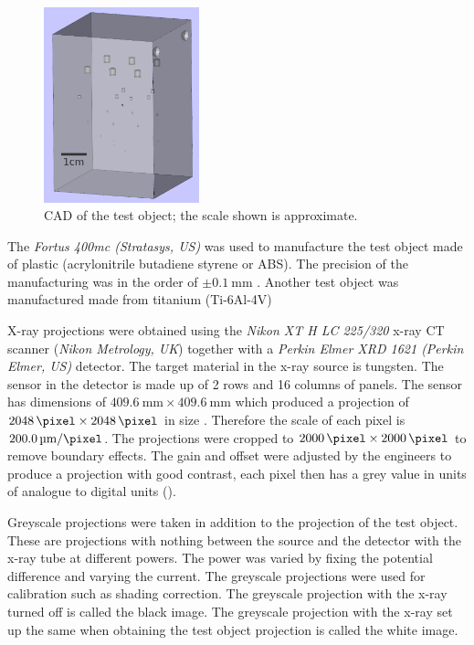 \begin{figure}
  \centering
  \includegraphics[width=0.4\textwidth]{../figures/inference/TestObject.png}
  \caption{CAD of the test object; the scale shown is approximate.}
  \label{fig:inference_testObject}
\end{figure}

The \emph{Fortus 400mc (Stratasys, US)} was used to manufacture the test object made of plastic (acrylonitrile butadiene styrene or ABS). The precision of the manufacturing was in the order of $\pm\SI{0.1}{\milli\metre}$ \citep{hanseen2013fortus}. Another test object was manufactured made from titanium (Ti-6Al-4V)

X-ray projections were obtained using the \emph{Nikon XT H LC 225/320} x-ray CT scanner (\emph{Nikon Metrology, UK}) together with a \emph{Perkin Elmer XRD 1621 (Perkin Elmer, US)} detector. The target material in the x-ray source is tungsten. The sensor in the detector is made up of 2 rows and 16 columns of panels. The sensor has dimensions of $\SI{409.6}{\milli\metre}\times\SI{409.6}{\milli\metre}$ which produced a projection of $\SI{2048}{\pixel}\times\SI{2048}{\pixel}$ in size \citep{perkinelmer2006xrd}. Therefore the scale of each pixel is $\SI{200.0}{\micro\metre\per\pixel}$. The projections were cropped to $\SI{2000}{\pixel}\times\SI{2000}{\pixel}$ to remove boundary effects. The gain and offset were adjusted by the engineers to produce a projection with good contrast, each pixel then has a grey value in units of analogue to digital units (\SI{}{\adu}).

Greyscale projections were taken in addition to the projection of the test object. These are projections with nothing between the source and the detector with the x-ray tube at different powers. The power was varied by fixing the potential difference and varying the current. The greyscale projections were used for calibration such as shading correction. The greyscale projection with the x-ray turned off is called the black image. The greyscale projection with the x-ray set up the same when obtaining the test object projection is called the white image.

